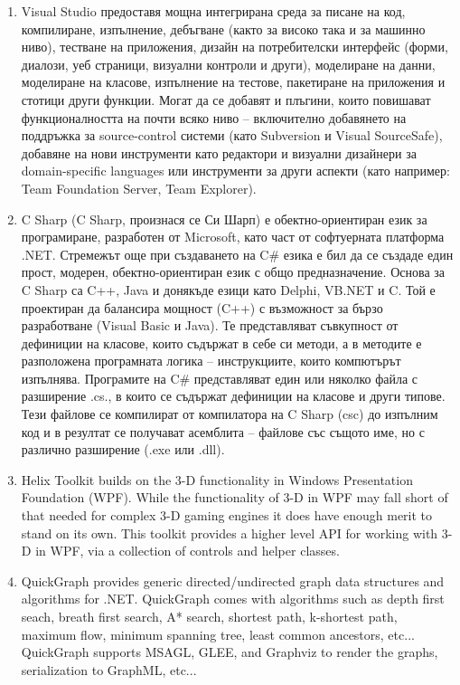 \begin{enumerate}
    \item Visual Studio предоставя мощна интегрирана среда за писане на код, компилиране, изпълнение, дебъгване (както за високо така и за машинно ниво), тестване на приложения, дизайн на потребителски интерфейс (форми, диалози, уеб страници, визуални контроли и други), моделиране на данни, моделиране на класове, изпълнение на тестове, пакетиране на приложения и стотици други функции. Могат да се добавят и плъгини, които повишават функционалността на почти всяко ниво – включително добавянето на поддръжка за source-control системи (като Subversion и Visual SourceSafe), добавяне на нови инструменти като редактори и визуални дизайнери за domain-specific languages или инструменти за други аспекти (като например: Team Foundation Server, Team Explorer). \cite{vs}
    
    \item C Sharp (C Sharp, произнася се Си Шарп) е обектно-ориентиран език за програмиране, разработен от Microsoft, като част от софтуерната платформа .NET. Стремежът още при създаването на C# езика е бил да се създаде един прост, модерен, обектно-ориентиран език с общо предназначение. Основа за C Sharp са C++, Java и донякъде езици като Delphi, VB.NET и C. Той е проектиран да балансира мощност (C++) с възможност за бързо разработване (Visual Basic и Java). Те представляват съвкупност от дефиниции на класове, които съдържат в себе си методи, а в методите е разположена програмната логика – инструкциите, които компютърът изпълнява. Програмите на C# представляват един или няколко файла с разширение .cs., в които се съдържат дефиниции на класове и други типове. Тези файлове се компилират от компилатора на C Sharp (csc) до изпълним код и в резултат се получават асемблита – файлове със същото име, но с различно разширение (.exe или .dll). \cite{csharp}
    
    \item Helix Toolkit builds on the 3-D functionality in Windows Presentation Foundation (WPF). While the functionality of 3-D in WPF may fall short of that needed for complex 3-D gaming engines it does have enough merit to stand on its own. This toolkit provides a higher level API for working with 3-D in WPF, via a collection of controls and helper classes. \cite{helix}
    
    \item QuickGraph provides generic directed/undirected graph data structures and algorithms for .NET. QuickGraph comes with algorithms such as depth first seach, breath first search, A* search, shortest path, k-shortest path, maximum flow, minimum spanning tree, least common ancestors, etc... QuickGraph supports MSAGL, GLEE, and Graphviz to render the graphs, serialization to GraphML, etc... \cite{quickgraph}

    
\end{enumerate}